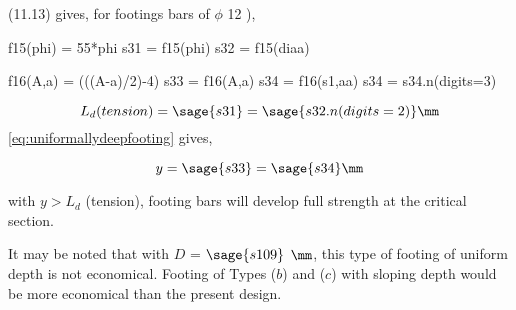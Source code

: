\begin{example}
\begin{enumerate}[(i)]
\tablem (11.13) gives, for footings bars of $\phi$ 12 
\fefouronefive),

\begin{sagesilent}
  f15(phi) = 55*phi
  s31 = f15(phi)
  s32 = f15(diaa)

  f16(A,a) = (((A-a)/2)-4)
  s33 = f16(A,a)
  s34 = f16(s1,aa)
  s34 = s34.n(digits=3)
\end{sagesilent}

$$L_d(tension) = \sage{s31} = \sage{s32.n(digits=2)} \mm$$
\eqn \ref{eq:uniformallydeepfooting} gives,

$$y = \sage{s33} = \sage{s34} \mm$$

with $y > L_d$ (tension), footing bars will develop full strength at
the critical   section.
                                                                        
It may be noted that with $D$ = $\sage{s109}$  $\mm$, this type of footing
of uniform depth is   not economical. Footing of Types ($b$) and ($c$)
with sloping depth would be more economical than   the present design.
\end{enumerate}
\end{example}


